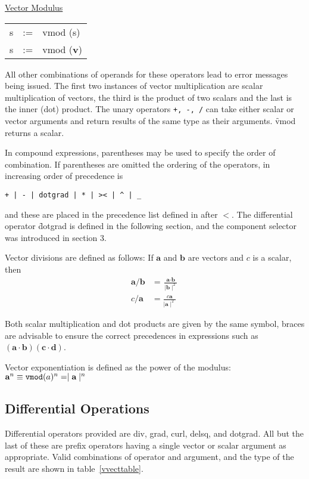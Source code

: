 \underline{Vector Modulus}\\
 
\begin{tabular}{rcl}
   s    &:=& vmod (s)\\
   s    &:=& vmod (\textbf{v}) 
\end{tabular}

All other combinations of operands for these operators lead to error 
messages being issued.  The first two instances of vector
multiplication are scalar multiplication of vectors, the third is the
 
 
product of two scalars and the last is the inner (dot) product.  The
unary operators  \texttt{+, -, /} can take either scalar or vector
arguments and return results of the same type as their arguments. 
\f{vmod} returns a scalar.

In compound expressions, parentheses may be used to specify the order of
combination.  If parentheses are omitted the ordering of the
operators, in increasing order of precedence is
\begin{verbatim}
+ | - | dotgrad | * | >< | ^ | _
\end{verbatim}
and these are placed in the precedence list defined in \REDUCE
after $<$.
The differential operator \f{dotgrad} is defined in the 
\hypertarget{operator:DORGRAD}{}
following section, and the component selector \texttt{\textunderscore} was introduced in
section 3.

Vector divisions are defined as follows:  If $\textbf{a}$ and $\textbf{b}$ are
vectors and $c$ is a scalar, then
\begin{align*}
\textbf{a} /  \textbf{b} & =   \frac{\textbf{a} \cdot \textbf{b}}{  \mid \textbf{b} 
\mid^2}\\
c / \textbf{a}   & =   \frac{c \textbf{a}  }{ \mid \textbf{a} \mid^2}
\end{align*}

Both scalar multiplication and dot products are given by the same symbol, 
braces are advisable to ensure the correct
precedences in expressions such as $(\textbf{a} \cdot \textbf{b}) 
(\textbf{c} \cdot \textbf{d})$.

Vector exponentiation is defined as the power of the modulus:\\
$\textbf{a}^n \equiv  \texttt{vmod}(a)^n =   \mid \textbf{a} \mid^n$

\subsection{Differential Operations}
Differential operators provided are div, grad, curl, delsq, and dotgrad.
 
 
\hypertarget{operator:DOTGRAD}{}
All but the last of these are prefix operators having a single
vector or scalar argument as appropriate.  Valid combinations of 
operator and argument, and the type of the result are shown in table~\ref{vvecttable}.


